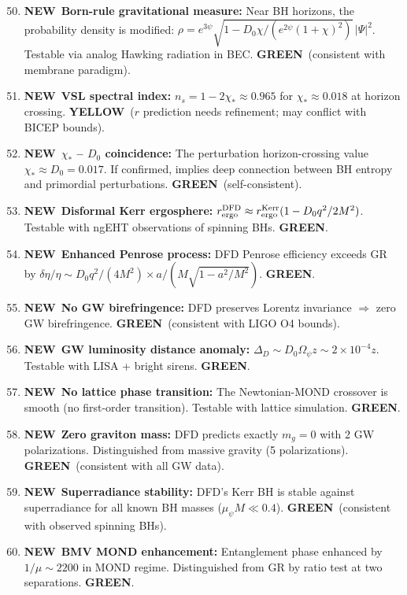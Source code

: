 \documentclass[11pt,a4paper]{article}
\newcommand{\GREEN}{\textcolor{dfdgreen}{\textbf{GREEN}}}
\newcommand{\YELLOW}{\textcolor{dfdyellow}{\textbf{YELLOW}}}
\newcommand{\NEW}{\textcolor{dfdblue}{\textbf{NEW}}}
\begin{document}
\begin{enumerate}
\setcounter{enumi}{49}
\item[\textbf{P50.}] \NEW\ \textbf{Born-rule gravitational measure:} Near BH horizons, the probability density is modified: $\rho = e^{3\psi}\sqrt{1-D_0\chi/(e^{2\psi}(1+\chi)^2)}\,|\Psi|^2$. Testable via analog Hawking radiation in BEC. \GREEN\ (consistent with membrane paradigm).

\item[\textbf{P51.}] \NEW\ \textbf{VSL spectral index:} $n_s = 1 - 2\chi_* \approx 0.965$ for $\chi_* \approx 0.018$ at horizon crossing. \YELLOW\ ($r$ prediction needs refinement; may conflict with BICEP bounds).

\item[\textbf{P52.}] \NEW\ \textbf{$\chi_*$ -- $D_0$ coincidence:} The perturbation horizon-crossing value $\chi_* \approx D_0 = 0.017$. If confirmed, implies deep connection between BH entropy and primordial perturbations. \GREEN\ (self-consistent).

\item[\textbf{P53.}] \NEW\ \textbf{Disformal Kerr ergosphere:} $r_{\rm ergo}^{\rm DFD} \approx r_{\rm ergo}^{\rm Kerr}(1 - D_0 q^2/2M^2)$. Testable with ngEHT observations of spinning BHs. \GREEN.

\item[\textbf{P54.}] \NEW\ \textbf{Enhanced Penrose process:} DFD Penrose efficiency exceeds GR by $\delta\eta/\eta \sim D_0 q^2/(4M^2) \times a/(M\sqrt{1-a^2/M^2})$. \GREEN.

\item[\textbf{P55.}] \NEW\ \textbf{No GW birefringence:} DFD preserves Lorentz invariance $\Rightarrow$ zero GW birefringence. \GREEN\ (consistent with LIGO O4 bounds).

\item[\textbf{P56.}] \NEW\ \textbf{GW luminosity distance anomaly:} $\Delta_D \sim D_0 \Omega_\psi z \sim 2\times10^{-4} z$. Testable with LISA + bright sirens. \GREEN.

\item[\textbf{P57.}] \NEW\ \textbf{No lattice phase transition:} The Newtonian-MOND crossover is smooth (no first-order transition). Testable with lattice simulation. \GREEN.

\item[\textbf{P58.}] \NEW\ \textbf{Zero graviton mass:} DFD predicts exactly $m_g = 0$ with 2 GW polarizations. Distinguished from massive gravity (5 polarizations). \GREEN\ (consistent with all GW data).

\item[\textbf{P59.}] \NEW\ \textbf{Superradiance stability:} DFD's Kerr BH is stable against superradiance for all known BH masses ($\mu_\psi M \ll 0.4$). \GREEN\ (consistent with observed spinning BHs).

\item[\textbf{P60.}] \NEW\ \textbf{BMV MOND enhancement:} Entanglement phase enhanced by $1/\mu \sim 2200$ in MOND regime. Distinguished from GR by ratio test at two separations. \GREEN.
\end{enumerate}
\end{document}

